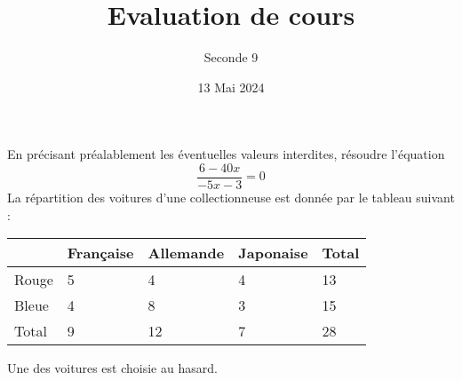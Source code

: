 \documentclass{exam}
\title{Evaluation de cours}
\date{13 Mai 2024}
\author{Seconde 9}
\begin{document}
\maketitle
\thispagestyle{head}
\begin{questions}
\question En précisant préalablement les éventuelles valeurs interdites, résoudre l'équation
\begin{equation*}
\dfrac{6-40x}{-5x-3}=0    
\end{equation*}
\makeemptybox{8cm}
\question La répartition des voitures d'une collectionneuse est donnée par le tableau suivant :
\begin{center}    
\begin{tabular}{|C{2cm}|C{2cm}|C{2cm}|C{2cm}|C{2cm}|}
\hline
&Française&Allemande&Japonaise&Total\\
\hline
Rouge & 5 & 4 & 4 & 13\\
\hline
Bleue & 4 & 8 & 3 & 15\\
\hline
Total & 9 & 12 & 7 & 28\\
\hline
\end{tabular}
\end{center}
Une des voitures est choisie au hasard. 
\makeemptybox{4cm}
\end{questions}
\end{document}

